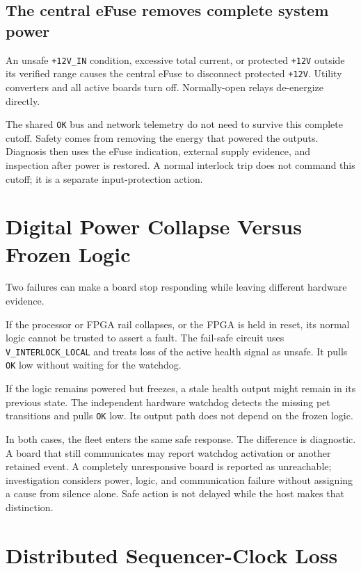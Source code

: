 \subsection{The central eFuse removes complete system power}

An unsafe \texttt{+12V\_IN} condition, excessive total current, or protected \texttt{+12V} outside its verified range causes the central eFuse to disconnect protected \texttt{+12V}. Utility converters and all active boards turn off. Normally-open relays de-energize directly.

The shared \texttt{OK} bus and network telemetry do not need to survive this complete cutoff. Safety comes from removing the energy that powered the outputs. Diagnosis then uses the eFuse indication, external supply evidence, and inspection after power is restored. A normal interlock trip does not command this cutoff; it is a separate input-protection action.

\section{Digital Power Collapse Versus Frozen Logic}

Two failures can make a board stop responding while leaving different hardware evidence.

If the processor or FPGA rail collapses, or the FPGA is held in reset, its normal logic cannot be trusted to assert a fault. The fail-safe circuit uses \texttt{V\_INTERLOCK\_LOCAL} and treats loss of the active health signal as unsafe. It pulls \texttt{OK} low without waiting for the watchdog.

If the logic remains powered but freezes, a stale health output might remain in its previous state. The independent hardware watchdog detects the missing pet transitions and pulls \texttt{OK} low. Its output path does not depend on the frozen logic.

In both cases, the fleet enters the same safe response. The difference is diagnostic. A board that still communicates may report watchdog activation or another retained event. A completely unresponsive board is reported as unreachable; investigation considers power, logic, and communication failure without assigning a cause from silence alone. Safe action is not delayed while the host makes that distinction.

\section{Distributed Sequencer-Clock Loss}


